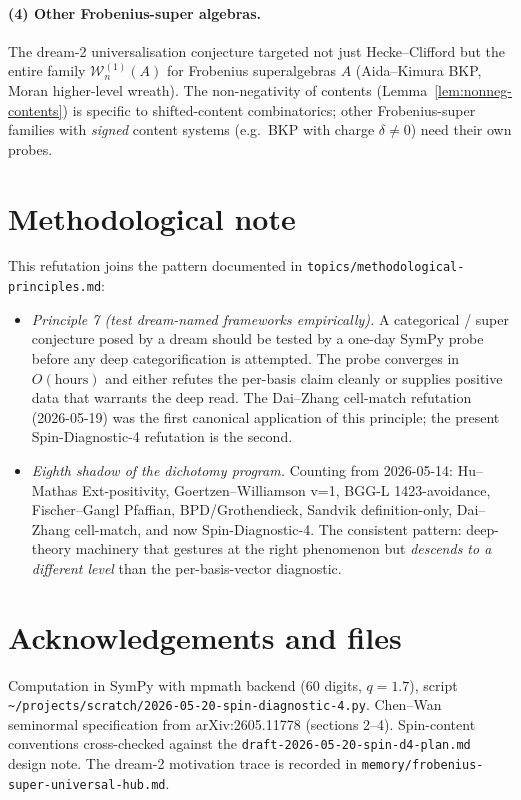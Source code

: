\documentclass[11pt]{article}
\begin{document}
\paragraph{(4) Other Frobenius-super algebras.}
The dream-2 universalisation conjecture targeted not just Hecke--Clifford
but the entire family $\mathcal{W}^{(1)}_{n}(A)$ for Frobenius
superalgebras $A$ (Aida--Kimura BKP, Moran higher-level wreath). The
non-negativity of contents (Lemma~\ref{lem:nonneg-contents}) is specific to
shifted-content combinatorics; other Frobenius-super families with
\emph{signed} content systems (e.g.\ BKP with charge $\delta \ne 0$) need
their own probes.

\section{Methodological note}
\label{sec:method}

This refutation joins the pattern documented in
\verb|topics/methodological-principles.md|:
\begin{itemize}
\item \emph{Principle 7 (test dream-named frameworks empirically).}
A categorical / super conjecture posed by a dream should be tested by a
one-day SymPy probe before any deep categorification is attempted. The
probe converges in $O(\text{hours})$ and either refutes the per-basis claim
cleanly or supplies positive data that warrants the deep read.
The Dai--Zhang cell-match refutation (2026-05-19) was the first canonical
application of this principle; the present Spin-Diagnostic-4 refutation
is the second.
\item \emph{Eighth shadow of the dichotomy program.}
Counting from 2026-05-14: Hu--Mathas Ext-positivity, Goertzen--Williamson
v=1, BGG-L 1423-avoidance, Fischer--Gangl Pfaffian, BPD/Grothendieck,
Sandvik definition-only, Dai--Zhang cell-match, and now Spin-Diagnostic-4.
The consistent pattern: deep-theory machinery that gestures at the
right phenomenon but \emph{descends to a different level} than the
per-basis-vector diagnostic.
\end{itemize}

\section{Acknowledgements and files}

Computation in SymPy with mpmath backend (60 digits, $q = 1.7$), script
\verb|~/projects/scratch/2026-05-20-spin-diagnostic-4.py|.
Chen--Wan seminormal specification from arXiv:2605.11778 (sections 2--4).
Spin-content conventions cross-checked against the
\verb|draft-2026-05-20-spin-d4-plan.md| design note. The dream-2 motivation
trace is recorded in \verb|memory/frobenius-super-universal-hub.md|.
\end{document}
